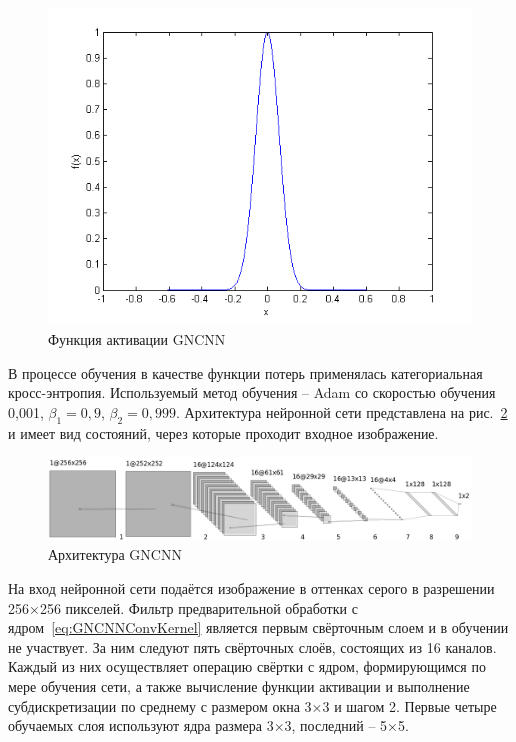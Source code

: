 \begin{figure}
\centering
\includegraphics[width=1\textwidth]{include/graphics/gaussian_function}
\caption{Функция активации GNCNN}
\label{fig:GaussianFunction}
\end{figure}

В процессе обучения в качестве функции потерь применялась категориальная кросс-энтропия. Используемый метод обучения – Adam со скоростью обучения 0,001, $ \beta_1 = 0,9 $, $ \beta_2 = 0,999 $. Архитектура нейронной сети представлена на рис.~\ref{fig:GNCNNArchitecture} и имеет вид состояний, через которые проходит входное изображение.

\begin{figure}
\centering
\includegraphics[width=1\textwidth]{include/graphics/gncnn_gray_architecture}
\caption{Архитектура GNCNN}
\label{fig:GNCNNArchitecture}
\end{figure}

На вход нейронной сети подаётся изображение в оттенках серого в разрешении 256×256 пикселей. Фильтр предварительной обработки с ядром~\eqref{eq:GNCNNConvKernel} является первым свёрточным слоем и в обучении не участвует. За ним следуют пять свёрточных слоёв, состоящих из 16 каналов. Каждый из них осуществляет операцию свёртки с ядром, формирующимся по мере обучения сети, а также вычисление функции активации и выполнение субдискретизации по среднему с размером окна 3×3 и шагом 2. Первые четыре обучаемых слоя используют ядра размера 3×3, последний – 5×5.

